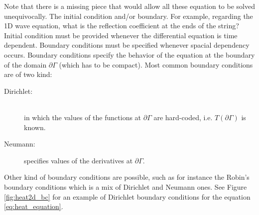 Note that there is a missing piece that would allow all these equation to be solved unequivocally. The initial condition and/or boundary. For example, regarding the 1D wave equation, what is the reflection coefficient at the ends of the string? 
Initial condition must be provided whenever the differential equation is time dependent. Boundary conditions must be specified whenever spacial dependency occurs. Boundary conditions specify the behavior of the equation at the boundary of the domain $\partial \Gamma$ (which has to be compact). Most common boundary conditions are of two kind:
\begin{description}
	\item [Dirichlet:] \hfil \\ in which the values of the functions at $\partial \Gamma$ are hard-coded, i.e. $T(\partial \Gamma)$  is known.
	
	\item [Neumann:] specifies values of the derivatives at $\partial \Gamma$.
	
\end{description} 
Other kind of boundary conditions are possible, such as for instance the Robin's boundary conditions which is a mix of Dirichlet and Neumann ones. See Figure \ref{fig:heat2d_bc} for an example of Dirichlet boundary conditions for the equation \ref{eq:heat_equation}.


